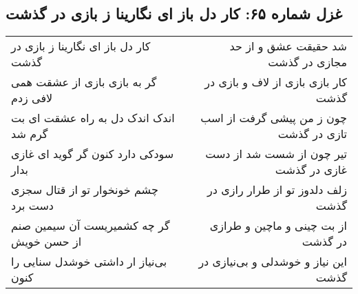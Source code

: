 \begin{center}
\section*{غزل شماره ۶۵: کار دل باز ای نگارینا ز بازی در گذشت}
\label{sec:065}
\begin{longtable}{l p{0.5cm} r}
کار دل باز ای نگارینا ز بازی در گذشت
&&
شد حقیقت عشق و از حد مجازی در گذشت
\\
گر به بازی بازی از عشقت همی لافی زدم
&&
کار بازی بازی از لاف و بازی در گذشت
\\
اندک اندک دل به راه عشقت ای بت گرم شد
&&
چون ز من پیشی گرفت از اسب تازی در گذشت
\\
سودکی دارد کنون گر گوید ای غازی بدار
&&
تیر چون از شست شد از دست غازی در گذشت
\\
چشم خونخوار تو از قتال سجزی دست برد
&&
زلف دلدوز تو از طرار رازی در گذشت
\\
گر چه کشمیریست آن سیمین صنم از حسن خویش
&&
از بت چینی و ماچین و طرازی در گذشت
\\
بی‌نیاز ار داشتی خوشدل سنایی را کنون
&&
این نیاز و خوشدلی و بی‌نیازی در گذشت
\\
\end{longtable}
\end{center}
